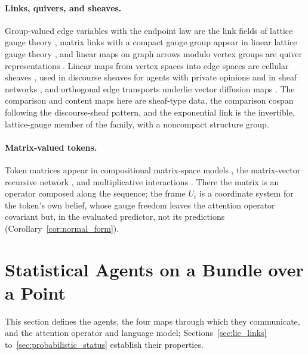\documentclass[twoside,11pt]{article}
\begin{document}
\paragraph{Links, quivers, and sheaves.} Group-valued edge variables with the endpoint law are the link fields of lattice gauge theory \citep{WilsonConfinement1974,KogutSusskind1975,Kogut1979RMP,Creutz1983}, matrix links with a compact gauge group appear in linear lattice gauge theory \citep{Wetterich2014LinearLattice}, and linear maps on graph arrows modulo vertex groups are quiver representations \citep{King1994Quiver,DouglasMoore1996Quivers}. Linear maps from vertex spaces into edge spaces are cellular sheaves \citep{HansenGhrist2019}, used in discourse sheaves for agents with private opinions \citep{HansenGhrist2021Discourse} and in sheaf networks \citep{HansenGebhart2020SheafNN,Bodnar2022NeuralSheaf,Barbero2022SheafConnection}, and orthogonal edge transports underlie vector diffusion maps \citep{SingerWu2012}. The comparison and content maps here are sheaf-type data, the comparison cospan following the discourse-sheaf pattern, and the exponential link is the invertible, lattice-gauge member of the family, with a noncompact structure group.

\paragraph{Matrix-valued tokens.} Token matrices appear in compositional matrix-space models \citep{RudolphGiesbrecht2010CMSM,BaroniZamparelli2010Nouns,Mai2019CMOW}, the matrix-vector recursive network \citep{Socher2012MVRNN}, and multiplicative interactions \citep{Jayakumar2020Multiplicative}. There the matrix is an operator composed along the sequence; the frame $U_i$ is a coordinate system for the token's own belief, whose gauge freedom leaves the attention operator covariant but, in the evaluated predictor, not its predictions (Corollary~\ref{cor:normal_form}).


\section{Statistical Agents on a Bundle over a Point}
\label{sec:construction_overview}

This section defines the agents, the four maps through which they communicate, and the attention operator and language model; Sections~\ref{sec:lie_links} to~\ref{sec:probabilistic_status} establish their properties.
\end{document}
